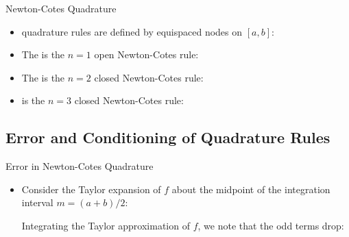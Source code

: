 \begin{frame}{Newton-Cotes Quadrature}

\begin{itemize}
\item {} quadrature rules are defined by equispaced nodes on $[a,b]$:


\item The  is the $n=1$ open Newton-Cotes rule:

\mdcond{
\[M(f) = (b-a)f\left(\frac{a+b}{2}\right)\]
}

\item The  is the $n=2$ closed Newton-Cotes rule:

\mdcond{
\[T(f) = \frac{(b-a)}{2}(f(a) + f(b))\]
}

\item {} is the $n=3$ closed Newton-Cotes rule:

\mdcond{
\[S(f)=\frac{b-a}{6}\left(f(a) + 4f\left(\frac{a+b}{2}\right) + f(b)\right)\]
}

\end{itemize}

\end{frame}


\subsection{Error and Conditioning of Quadrature Rules}
\begin{frame}[fragile]{Error in Newton-Cotes Quadrature}

\begin{itemize}
\item Consider the Taylor expansion of $f$ about the midpoint of the integration interval $m=(a+b)/2$:
\mdcond{
\[f(x) = f(m) + f'(m)(x-m) + \frac{f''(m)}{2}(x-m)^2 +\ldots\]
}

Integrating the Taylor approximation of $f$, we note that the odd terms drop: 
\end{itemize}

\end{frame}


